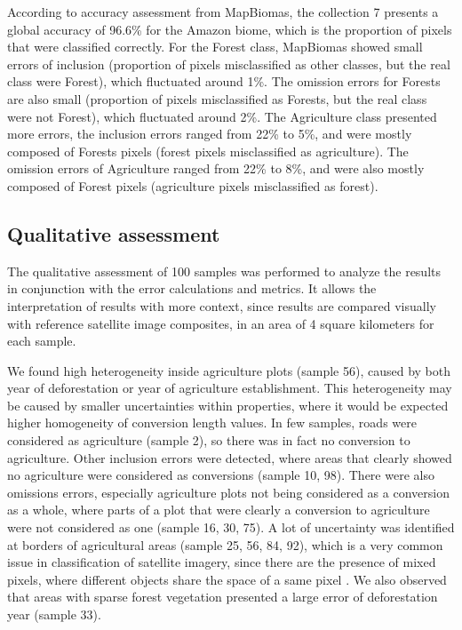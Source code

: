 \documentclass[essd, manuscript]{copernicus}
\begin{document}
According to accuracy assessment from MapBiomas, the collection 7 presents a global accuracy of 96.6\% for the Amazon biome, which is the proportion of pixels that were classified correctly.
For the Forest class, MapBiomas showed small errors of inclusion (proportion of pixels misclassified as other classes, but the real class were Forest), which fluctuated around 1\%.
The omission errors for Forests are also small (proportion of pixels misclassified as Forests, but the real class were not Forest), which fluctuated around 2\%.
The Agriculture class presented more errors, the inclusion errors ranged from 22\% to 5\%, and were mostly composed of Forests pixels (forest pixels misclassified as agriculture).
The omission errors of Agriculture ranged from 22\% to 8\%, and were also mostly composed of Forest pixels (agriculture pixels misclassified as forest).

\subsection{Qualitative assessment}

The qualitative assessment of 100 samples was performed to analyze the results in conjunction with the error calculations and metrics.
It allows the interpretation of results with more context, since results are compared visually with reference satellite image composites, in an area of 4 square kilometers for each sample.

We found high heterogeneity inside agriculture plots (sample 56), caused by both year of deforestation or year of agriculture establishment.
This heterogeneity may be caused by smaller uncertainties within properties, where it would be expected higher homogeneity of conversion length values.
In few samples, roads were considered as agriculture (sample 2), so there was in fact no conversion to agriculture.
Other inclusion errors were detected, where areas that clearly showed no agriculture were considered as conversions (sample 10, 98).
There were also omissions errors, especially agriculture plots not being considered as a conversion as a whole, where parts of a plot that were clearly a conversion to agriculture were not considered as one (sample 16, 30, 75).
A lot of uncertainty was identified at borders of agricultural areas (sample 25, 56, 84, 92), which is a very common issue in classification of satellite imagery, since there are the presence of mixed pixels, where different objects share the space of a same pixel \citep{Kaur2019}.
We also observed that areas with sparse forest vegetation presented a large error of deforestation year (sample 33).
\end{document}
